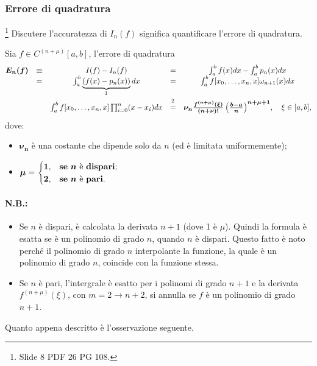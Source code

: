 \subsubsection{Errore di quadratura}
\footnote{Slide 8 PDF 26 PG 108.} Discutere l'accuratezza di $I_n(f)$ significa quantificare l'errore di quadratura.
\begin{definition}
	Sia $f\in C^{(n+\mu)}[a,b]$, l'errore di quadratura 
	\begin{equation}\label{eq:errore_quadratura}
	    \begin{matrix}
	        \boldsymbol{E_n(f)}&\boldsymbol{\equiv}& I(f)-I_n(f)&=&\int_a^b f(x)dx-\int_a^bp_n(x)dx\\
	        &=&\int_a^b\underbrace{(f(x)-p_n(x))}_{\footnotemark}dx&=&\int_a^bf[x_0,\hdots,x_n,x]\omega_{n+1}(x)dx\\
	        &&\int_a^bf[x_0,\hdots,x_n,x]\prod_{i=0}^n(x-x_i)dx&\overset{\footnotemark}{=}&\boldsymbol{\nu_n \frac{f^{(n+\mu)}(\xi)}{(n+\nu)!}\left(\frac{b-a}{n}\right)^{n+\mu+1}},\quad\xi\in [a,b],
	    \end{matrix}
	\end{equation}
	\noindent dove:
	\begin{itemize}
		\item $\boldsymbol{\nu_n}$ è una costante che dipende solo da $n$ (ed è limitata uniformemente);
		\item $\boldsymbol{\mu}=
		\begin{cases}
			\boldsymbol 1, &\text{\textbf{se} $\boldsymbol n$ è \textbf{dispari};}\\
			\boldsymbol 2, &\text{\textbf{se} $\boldsymbol n$ è \textbf{pari}.}
		\end{cases}$
	\end{itemize}
\end{definition}
\addtocounter{footnote}{-1}


\paragraph{N.B.:}
\begin{itemize}
	\item Se $n$ è dispari, è calcolata la derivata $n+1$ (dove 1 è $\mu$). Quindi la formula è esatta se è un polinomio di grado $n$, quando $n$ è dispari. Questo fatto è noto perché il polinomio di grado $n$ interpolante la funzione, la quale è un polinomio di grado $n$, coincide con la funzione stessa.
	\item Se $n$ è pari, l'intergrale è esatto per i polinomi di grado $n+1$ e la derivata $f^{(n+\mu)}(\xi)$, con $m=2\rightarrow n+2$, si annulla se $f$ è un polinomio di grado $n+1$.
\end{itemize}
Quanto appena descritto è l'osservazione seguente.

